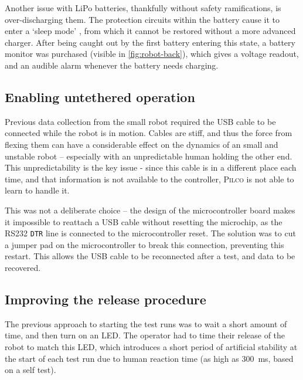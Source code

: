 \documentclass[main.tex]{subfiles}
\begin{document}
Another issue with LiPo batteries, thankfully without safety ramifications, is over-discharging them. The protection circuits within the battery cause it to enter a `sleep mode' \cite{lipo-sleep-mode}, from which it cannot be restored without a more advanced charger. After being caught out by the first battery entering this state, a battery monitor was purchased (visible in \cref{fig:robot-back}), which gives a voltage readout, and an audible alarm whenever the battery needs charging.


\subsection{Enabling untethered operation}
	\label{sec:untethered}

	Previous data collection from the small robot required the USB cable to be connected while the robot is in motion. Cables are stiff, and thus the force from flexing them can have a considerable effect on the dynamics of an small and unstable robot -- especially with an unpredictable human holding the other end. This unpredictability is the key issue - since this cable is in a different place each time, and that information is not available to the controller, \textsc{Pilco} is not able to learn to handle it.

	This was not a deliberate choice -- the design of the microcontroller board makes it impossible to reattach a USB cable without resetting the microchip, as the RS232 \texttt{DTR} line is connected to the microcontroller reset\footnotemark. The solution was to cut a jumper pad on the microcontroller to break this connection, preventing this restart. This allows the USB cable to be reconnected after a test, and data to be recovered.


\subsection{Improving the release procedure}
	\label{sec:switch}

	The previous approach to starting the test runs was to wait a short amount of time, and then turn on an LED.
	The operator had to time their release of the robot to match this LED, which introduces a short period of artificial stability at the start of each test run due to human reaction time (as high as \SI{300}{\milli\second}, based on a self test).
\end{document}
